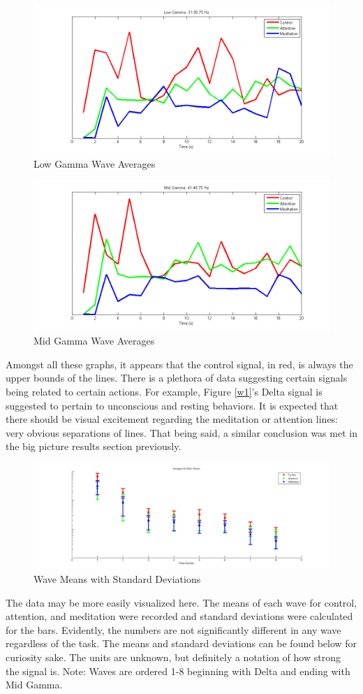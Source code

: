 \documentclass[journal]{IEEEtran}
\begin{document}
\begin{figure}[H]
    \centering
    \includegraphics[width=.5\textwidth]{EEG/wave7}
    \caption{Low Gamma Wave Averages}
    \label{w7}
\end{figure}

\begin{figure}[H]
    \centering
    \includegraphics[width=.5\textwidth]{EEG/wave8}
    \caption{Mid Gamma Wave Averages}
    \label{w8}
\end{figure}


Amongst all these graphs, it appears that the control signal, in red, is always the upper bounds of the lines. There is a plethora of data suggesting certain signals being related to certain actions. For example, Figure \ref{w1}'s Delta signal is suggested to pertain to unconscious and resting behaviors. It is expected that there should be visual excitement regarding the meditation or attention lines: very obvious separations of lines. That being said, a similar conclusion was met in the big picture results section previously. \par

\begin{figure}[H]
    \centering
    \includegraphics[width=.5\textwidth]{EEG/wave_averages}
    \caption{Wave Means with Standard Deviations}
    \label{w_av}
\end{figure} 

The data may be more easily visualized here. The means of each wave for control, attention, and meditation were recorded and standard deviations were calculated for the bars. Evidently, the numbers are not significantly different in any wave regardless of the task. The means and standard deviations can be found below for curiosity sake. The units are unknown, but definitely a notation of how strong the signal is. Note: Waves are ordered 1-8 beginning with Delta and ending with Mid Gamma.
\end{document}
